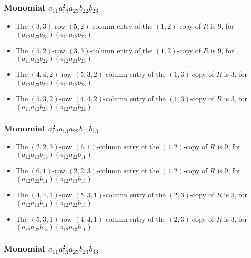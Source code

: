 \documentclass{article}
\begin{document}
\subsubsection{Monomial $ a_{11} a_{12}^{2} a_{23} b_{22} b_{23} $}

\begin{itemize}
\item The $(3, 3)$-row $(5, 2)$-column entry of the $ \left(1, 2\right) $-copy of $R$ is $ 9 $, for $( a_{12} a_{23} b_{23} )( a_{11} a_{12} b_{22} )$ 
\item The $(5, 2)$-row $(3, 3)$-column entry of the $ \left(1, 2\right) $-copy of $R$ is $ 9 $, for $( a_{11} a_{12} b_{22} )( a_{12} a_{23} b_{23} )$ 
\item The $(4, 4, 2)$-row $(5, 3, 2)$-column entry of the $ \left(1, 3\right) $-copy of $R$ is $ 3 $, for $( a_{12} a_{23} b_{22} )( a_{11} a_{12} b_{23} )$ 
\item The $(5, 3, 2)$-row $(4, 4, 2)$-column entry of the $ \left(1, 3\right) $-copy of $R$ is $ 3 $, for $( a_{11} a_{12} b_{23} )( a_{12} a_{23} b_{22} )$ 
\end{itemize}
\subsubsection{Monomial $ a_{12}^{2} a_{13} a_{22} b_{11} b_{13} $}

\begin{itemize}
\item The $(2, 2, 3)$-row $(6, 1)$-column entry of the $ \left(1, 2\right) $-copy of $R$ is $ 9 $, for $( a_{12} a_{13} b_{13} )( a_{12} a_{22} b_{11} )$ 
\item The $(6, 1)$-row $(2, 2, 3)$-column entry of the $ \left(1, 2\right) $-copy of $R$ is $ 9 $, for $( a_{12} a_{22} b_{11} )( a_{12} a_{13} b_{13} )$ 
\item The $(4, 4, 1)$-row $(5, 3, 1)$-column entry of the $ \left(2, 3\right) $-copy of $R$ is $ 3 $, for $( a_{12} a_{13} b_{11} )( a_{12} a_{22} b_{13} )$ 
\item The $(5, 3, 1)$-row $(4, 4, 1)$-column entry of the $ \left(2, 3\right) $-copy of $R$ is $ 3 $, for $( a_{12} a_{22} b_{13} )( a_{12} a_{13} b_{11} )$ 
\end{itemize}
\subsubsection{Monomial $ a_{11} a_{13}^{2} a_{23} b_{23} b_{33} $}
\end{document}
